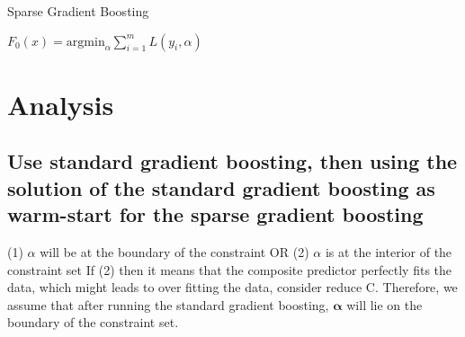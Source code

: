 \documentclass{article} %
\begin{document}
\begin{algorithm}[H]
\caption{Sparse Gradient Boosting}
 \SetAlgoLined

  \BlankLine
 $F_0(x)=\text{argmin}_\alpha\sum_{i=1}^mL(y_i,\alpha)$\\   %

\end{algorithm}

\section{Analysis}

\subsection{ Use standard gradient boosting, then using the solution of the standard gradient boosting as warm-start for the sparse gradient boosting }
(1) $\alpha$ will be at the boundary of the constraint OR (2) $\alpha$ is at the interior of the constraint set
If (2) then it means that the composite predictor perfectly fits the data, which might leads to over fitting the data, consider reduce C. Therefore, we assume that after running the standard gradient boosting, ${\boldsymbol\alpha}$ will lie on the boundary of the constraint set.
\end{document}
